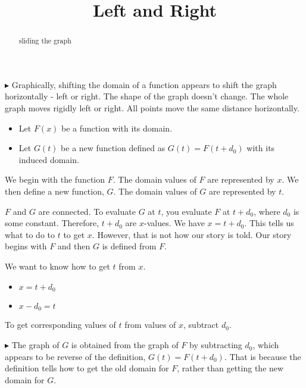 \documentclass{ximera}
\title{Left and Right}
\begin{document}
\begin{abstract}
sliding the graph
\end{abstract}
\maketitle






$\blacktriangleright$ Graphically, shifting the domain of a function appears to shift the graph horizontally - left or right.  The shape of the graph doesn't change.  The whole graph moves rigidly left or right.  All points move the same distance horizontally. \\


\begin{itemize}
\item Let $F(x)$ be a function with its domain.

\item Let $G(t)$ be a new function defined as $G(t) = F(t+d_0)$ with its induced domain.
\end{itemize}



We begin with the function $F$.  The domain values of $F$ are represented by $x$.  We then define a new function, $G$. The domain values of $G$ are represented by $t$. 

$F$ and $G$ are connected.  To evaluate $G$ at $t$, you evaluate $F$ at $t + d_0$, where $d_0$ is some constant.  Therefore, $t + d_0$ are $x$-values. We have $x = t + d_0$.  This tells us what to do to $t$ to get $x$.  However, that is not how our story is told.  Our story begins with $F$ and then $G$ is defined from $F$.  

We want to know how to get $t$ from $x$.  


\begin{itemize}
\item $x = t + d_0$

\item $x - d_0 = t$
\end{itemize}


To get corresponding values of $t$ from values of $x$, subtract $d_0$.   



$\blacktriangleright$  The graph of $G$ is obtained from the graph of $F$ by subtracting $d_0$, which appears to be reverse of the definition, $G(t) = F(t+d_0)$.  That is because the definition tells how to get the old domain for $F$, rather than getting the new domain for $G$.
\end{document}
